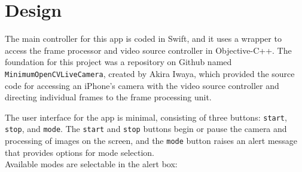 \documentclass[11pt,letterpaper]{article}
\begin{document}
	\newpage
	\section{Design}
	The main controller for this app is coded in Swift, and it uses a wrapper to access the frame processor and video source controller in Objective-C++. The foundation for this project was a repository on Github named {\tt MinimumOpenCVLiveCamera}, created by Akira Iwaya, which provided the source code for accessing an iPhone's camera with the video source controller and directing individual frames to the frame processing unit.
	
	The user interface for the app is minimal, consisting of three buttons: {\tt start}, {\tt stop}, and {\tt mode}. The {\tt start} and {\tt stop} buttons begin or pause the camera and processing of images on the screen, and the {\tt mode} button raises an alert message that provides options for mode selection.\\
	
	\noindent Available modes are selectable in the alert box:
	
\end{document}
